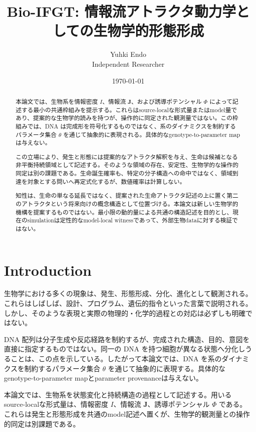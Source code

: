 \documentclass[11pt]{ltjsarticle}
\title{Bio-IFGT: 情報流アトラクタ動力学としての生物学的形態形成}
\author{
Yuhki Endo\\
Independent Researcher
}
\date{\today}
\newcommand{\I}{I}
\newcommand{\J}{\mathbf{J}}
\newcommand{\PhiI}{\Phi}
\begin{document}
\maketitle

\begin{abstract}
本論文では、生物系を情報密度 \(\I\)、情報流 \(\J\)、および誘導ポテンシャル \(\PhiI\) によって記述する最小の共通枠組みを提示する。これらはsource-localな形式量またはmodel量であり、提案的な生物学的読みを持つが、操作的に同定された観測量ではない。この枠組みでは、DNA は完成形を符号化するものではなく、系のダイナミクスを制約するパラメータ集合 \(\theta\) を通じて抽象的に表現される。具体的なgenotype-to-parameter mapは与えない。

この立場により、発生と形態には提案的なアトラクタ解釈を与え、生命は候補となる非平衡持続領域として記述する。そのような領域の存在、安定性、生物学的な操作的同定は別の課題である。生命誕生確率も、特定の分子構造への命中ではなく、領域到達を対象とする問いへ再定式化するが、数値確率は計算しない。

知性は、生命の単なる延長ではなく、提案された生命アトラクタ記述の上に置く第二のアトラクタという将来向けの概念構造として位置づける。本論文は新しい生物学的機構を提案するものではない。最小限の動的量による共通の構造記述を目的とし、現在のsimulationは定性的なmodel-local witnessであって、外部生物dataに対する検証ではない。
\end{abstract}

\setcounter{tocdepth}{1}
\tableofcontents
\clearpage

\section{Introduction}

生物学における多くの現象は、発生、形態形成、分化、進化として観測される。これらはしばしば、設計、プログラム、遺伝的指令といった言葉で説明される。しかし、そのような表現と実際の物理的・化学的過程との対応は必ずしも明確ではない。

DNA 配列は分子生成や反応経路を制約するが、完成された構造、目的、意図を直接に指定するものではない。同一の DNA を持つ細胞が異なる状態へ分化しうることは、この点を示している。したがって本論文では、DNA を系のダイナミクスを制約するパラメータ集合 \(\theta\) を通じて抽象的に表現する。具体的なgenotype-to-parameter mapとparameter provenanceは与えない。

本論文では、生物系を状態変化と持続構造の過程として記述する。用いるsource-localな形式量は、情報密度 \(\I\)、情報流 \(\J\)、誘導ポテンシャル \(\PhiI\) である。これらは発生と形態形成を共通のmodel記述へ置くが、生物学的観測量との操作的同定は別課題である。
\end{document}
